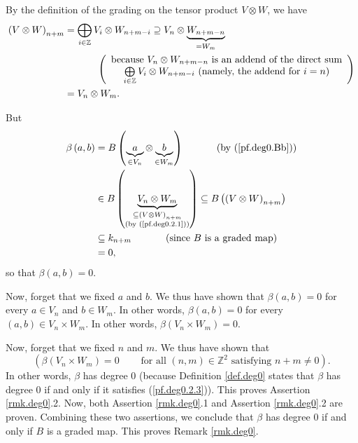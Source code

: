 \documentclass[etingof-lie.tex]{subfiles}
\begin{document}
\begin{verlong}
By the definition of the grading on the tensor product $V\otimes W$, we have
\begin{align}
\left(  V\otimes W\right)  _{n+m}  &  =\bigoplus\limits_{i\in\mathbb{Z}}%
V_{i}\otimes W_{n+m-i}\supseteq V_{n}\otimes\underbrace{W_{n+m-n}}_{=W_{m}%
}\nonumber\\
&  \ \ \ \ \ \ \ \ \ \ \left(
\begin{array}
[c]{c}%
\text{because }V_{n}\otimes W_{n+m-n}\text{ is an addend of the direct sum}\\
\bigoplus\limits_{i\in\mathbb{Z}}V_{i}\otimes W_{n+m-i}\text{ (namely, the
addend for }i=n\text{)}%
\end{array}
\right) \nonumber\\
&  =V_{n}\otimes W_{m}. \label{pf.deg0.2.1}%
\end{align}


But%
\begin{align*}
\beta\left(  a,b\right)   &  =B\left(  \underbrace{a}_{\in V_{n}}%
\otimes\underbrace{b}_{\in W_{m}}\right)  \ \ \ \ \ \ \ \ \ \ \left(  \text{by
(\ref{pf.deg0.Bb})}\right) \\
&  \in B\left(  \underbrace{V_{n}\otimes W_{m}}_{\substack{\subseteq\left(
V\otimes W\right)  _{n+m}\\\text{(by (\ref{pf.deg0.2.1}))}}}\right)  \subseteq
B\left(  \left(  V\otimes W\right)  _{n+m}\right) \\
&  \subseteq k_{n+m}\ \ \ \ \ \ \ \ \ \ \left(  \text{since }B\text{ is a
graded map}\right) \\
&  =0,
\end{align*}
so that $\beta\left(  a,b\right)  =0$.

Now, forget that we fixed $a$ and $b$. We thus have shown that $\beta\left(
a,b\right)  =0$ for every $a\in V_{n}$ and $b\in W_{m}$. In other words,
$\beta\left(  a,b\right)  =0$ for every $\left(  a,b\right)  \in V_{n}\times
W_{m}$. In other words, $\beta\left(  V_{n}\times W_{m}\right)  =0$.

Now, forget that we fixed $n$ and $m$. We thus have shown that%
\begin{equation}
\left(  \beta\left(  V_{n}\times W_{m}\right)  =0\ \ \ \ \ \ \ \ \ \ \text{for
all }\left(  n,m\right)  \in\mathbb{Z}^{2}\text{ satisfying }n+m\neq0\right)
. \label{pf.deg0.2.3}%
\end{equation}
In other words, $\beta$ has degree $0$ (because Definition \ref{def.deg0}
states that $\beta$ has degree $0$ if and only if it satisfies
(\ref{pf.deg0.2.3})). This proves Assertion \ref{rmk.deg0}.2. Now, both
Assertion \ref{rmk.deg0}.1 and Assertion \ref{rmk.deg0}.2 are proven.
Combining these two assertions, we conclude that $\beta$ has degree $0$ if and
only if $B$ is a graded map. This proves Remark \ref{rmk.deg0}.
\end{verlong}
\end{document}
